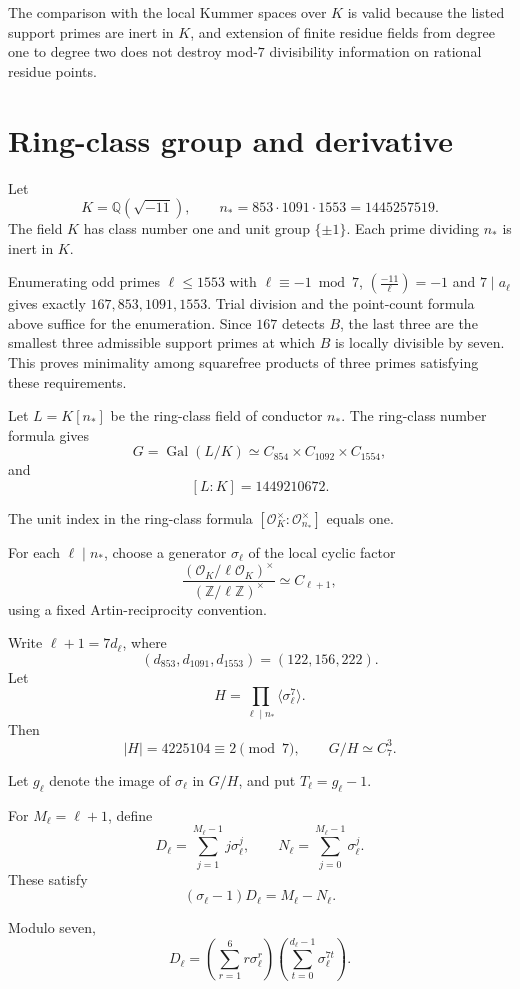 \documentclass[11pt]{article}
\begin{document}
The comparison with the local Kummer spaces
over $K$ is valid because the listed support
primes are inert in $K$, and extension of finite
residue fields from degree one to degree two
does not destroy mod-$7$ divisibility
information on rational residue points.

\section{Ring-class group and derivative}

Let
\[
 K=\mathbb Q(\sqrt{-11}),\qquad
 n_*=853\cdot1091\cdot1553
     =1445257519.
\]
The field $K$ has class number one and unit group
$\{\pm1\}$. Each prime dividing $n_*$ is inert
in $K$.

Enumerating odd primes $\ell\le1553$ with
$\ell\equiv-1\bmod7$, $(\frac{-11}{\ell})=-1$ and $7\mid a_\ell$
gives exactly $167,853,1091,1553$. Trial division and the point-count
formula above suffice for the enumeration. Since $167$ detects $B$,
the last three are the smallest three admissible support primes at
which $B$ is locally divisible by seven. This proves minimality among
squarefree products of three primes satisfying these requirements.

Let $L=K[n_*]$ be the ring-class field of
conductor $n_*$. The ring-class number formula
gives
\[
 G=\operatorname{Gal}(L/K)
 \simeq C_{854}\times C_{1092}\times C_{1554},
\]
and
\[
 \boxed{[L:K]=1449210672.}
\]

The unit index in the ring-class formula
$[\mathcal O_K^\times:\mathcal O_{n_*}^\times]$
equals one.

For each $\ell\mid n_*$, choose a generator
$\sigma_\ell$ of the local cyclic factor
\[
 \frac{(\mathcal O_K/\ell\mathcal O_K)^\times}
       {(\mathbb Z/\ell\mathbb Z)^\times}
 \simeq C_{\ell+1},
\]
using a fixed Artin-reciprocity convention.

Write $\ell+1=7d_\ell$, where
\[
 (d_{853},d_{1091},d_{1553})
       =(122,156,222).
\]
Let
\[
 H=\prod_{\ell\mid n_*}\langle\sigma_\ell^7\rangle.
\]
Then
\[
 |H|=4225104\equiv2\pmod7,\qquad
 G/H\simeq C_7^3.
\]

Let $g_\ell$ denote the image of $\sigma_\ell$
in $G/H$, and put $T_\ell=g_\ell-1$.

For $M_\ell=\ell+1$, define
\[
 D_\ell=\sum_{j=1}^{M_\ell-1}
             j\sigma_\ell^j,\qquad
 N_\ell=\sum_{j=0}^{M_\ell-1}\sigma_\ell^j.
\]
These satisfy
\[
 (\sigma_\ell-1)D_\ell=M_\ell-N_\ell.
\]

Modulo seven,
\[
 D_\ell=
 \left(\sum_{r=1}^{6}r\sigma_\ell^r\right)
 \left(\sum_{t=0}^{d_\ell-1}
                      \sigma_\ell^{7t}\right).
\]
\end{document}
